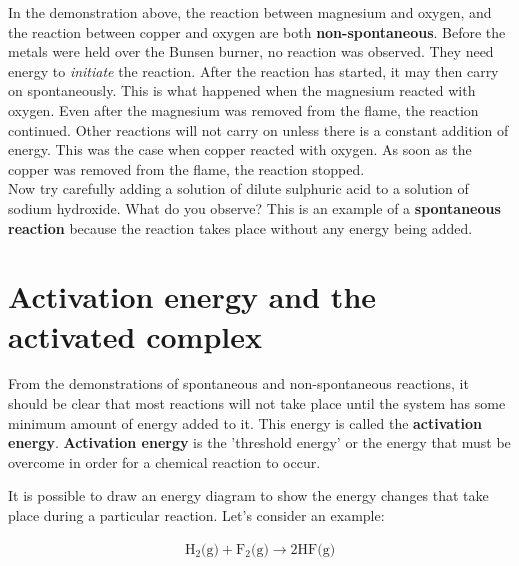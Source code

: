In the demonstration above, the reaction between magnesium and oxygen, and the reaction between copper and oxygen are both \textbf{non-spontaneous}. Before the metals were held over the Bunsen burner, no reaction was observed.  They need energy to \textit{initiate} the reaction. After the reaction has started, it may then carry on spontaneously. This is what happened when the magnesium reacted with oxygen. Even after the magnesium was removed from the flame, the reaction continued. Other reactions will not carry on unless there is a constant addition of energy. This was the case when copper reacted with oxygen. As soon as the copper was removed from the flame, the reaction stopped.\\

Now try carefully adding a solution of dilute sulphuric acid to a solution of sodium hydroxide. What do you observe? This is an example of a \textbf{spontaneous reaction} because the reaction takes place without any energy being added.







\section{Activation energy and the activated complex}
\label{sec:energychanges:activation}

From the demonstrations of spontaneous and non-spontaneous reactions, it should be clear that most reactions will not take place until the system has some minimum amount of energy added to it. This energy is called the \textbf{activation energy}. \textbf{Activation energy} is the 'threshold energy' or the energy that must be overcome in order for a chemical reaction to occur.


It is possible to draw an energy diagram to show the energy changes that take place during a particular reaction. Let's consider an example:

\begin{eqnarray*}
\text{H}_{2}\text{(g)} + \text{F}_{2}\text{(g)} \rightarrow 2\text{HF(g)}
\end{eqnarray*}


